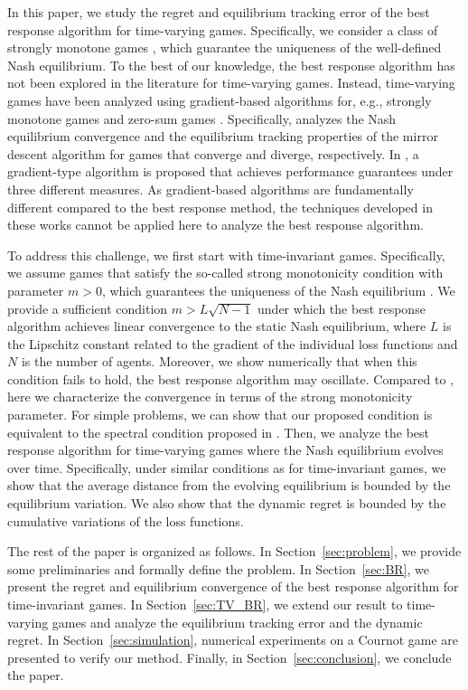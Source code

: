 In this paper, we study the regret and equilibrium tracking error of the best response algorithm for time-varying games. Specifically, we consider a class of strongly monotone games \cite{rosen1965existence,bravo2018bandit}, which guarantee the uniqueness of the well-defined Nash equilibrium. To the best of our knowledge, the best response algorithm has not been explored in the literature for time-varying games. 
%
Instead, time-varying games have been analyzed using  gradient-based algorithms for, e.g., strongly monotone games \cite{duvocelle2022multiagent} and zero-sum games \cite{zhang2022no}. Specifically, \cite{duvocelle2022multiagent} analyzes the Nash equilibrium convergence and the equilibrium tracking properties of the mirror descent algorithm for games that converge and diverge, respectively. In \cite{zhang2022no}, a gradient-type algorithm is proposed that achieves performance guarantees under three different measures.
As gradient-based algorithms are fundamentally different compared to the best response method, the techniques developed in these works cannot be applied here to analyze the best response algorithm.



To address this challenge, we first start with time-invariant games. Specifically, we assume games that satisfy the so-called strong monotonicity condition with parameter $m>0$, which guarantees the uniqueness of the Nash equilibrium \cite{rosen1965existence}. We provide a sufficient condition $m>L\sqrt{N-1}$ under which the best response algorithm achieves linear convergence to the static Nash equilibrium, where $L$ is the Lipschitz constant related to the gradient of the individual loss functions and $N$ is the number of agents. 
Moreover, we show numerically that when this condition fails to hold, the best response algorithm may oscillate. 
Compared to \cite{facchinei201012}, here we characterize the convergence in terms of the strong monotonicity parameter. For simple problems, we can show that our proposed condition is equivalent to the spectral condition proposed in \cite{facchinei201012}. 
%
Then, we analyze the best response algorithm for time-varying games where the Nash equilibrium evolves over time. Specifically, under similar conditions as for time-invariant games, we show that the average distance from the evolving equilibrium is bounded by the equilibrium variation. 
We also show that the dynamic regret is bounded by the cumulative variations of the loss functions.





%
The rest of the paper is organized as follows. In Section~\ref{sec:problem}, we provide some preliminaries and formally define the problem. In Section~\ref{sec:BR}, we present the regret and equilibrium convergence of the best response algorithm for time-invariant games. In Section~\ref{sec:TV_BR}, we extend our result to time-varying games and analyze the equilibrium tracking error and the dynamic regret. In Section~\ref{sec:simulation}, numerical experiments on  a Cournot game are presented to verify our method. Finally, in Section~\ref{sec:conclusion}, we conclude the paper.